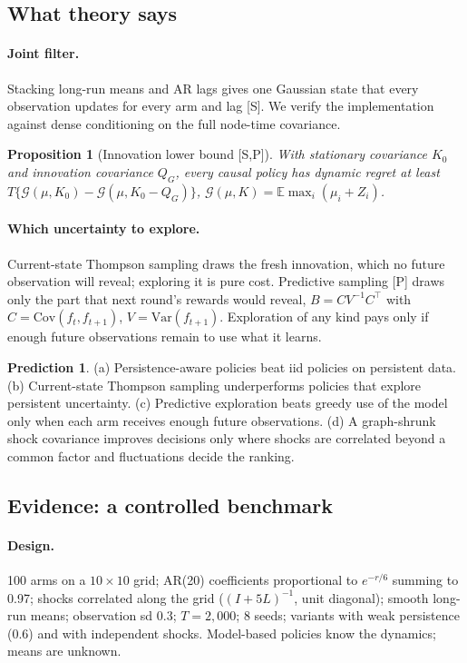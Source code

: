 \documentclass[11pt]{article}
\newtheorem{proposition}[theorem]{Proposition}
\theoremstyle{definition}
\newtheorem{prediction}{Prediction}
\theoremstyle{remark}
\newcommand{\E}{\mathbb{E}}
\newcommand{\Var}{\mathrm{Var}}
\newcommand{\Cov}{\mathrm{Cov}}
\newcommand{\src}[1]{\textsf{[#1]}}
\begin{document}
\subsection{What theory says}

\paragraph{Joint filter.} Stacking long-run means and AR lags gives one Gaussian state that every observation updates for every arm and lag \src{S}. We verify the implementation against dense conditioning on the full node-time covariance.

\begin{proposition}[Innovation lower bound \src{S,P}]\label{prop:floor}
With stationary covariance $K_0$ and innovation covariance $Q_G$, every causal policy has dynamic regret at least $T\{\mathcal G(\mu,K_0)-\mathcal G(\mu,K_0-Q_G)\}$, $\mathcal G(\mu,K)=\E\max_i(\mu_i+Z_i)$.
\end{proposition}

\paragraph{Which uncertainty to explore.} Current-state Thompson sampling draws the fresh innovation, which no future observation will reveal; exploring it is pure cost. Predictive sampling \src{P} draws only the part that next round's rewards would reveal, $B=CV^{-1}C^\top$ with $C=\Cov(f_t,f_{t+1})$, $V=\Var(f_{t+1})$. Exploration of any kind pays only if enough future observations remain to use what it learns.

\begin{prediction}\label{pred:q4}
(a) Persistence-aware policies beat iid policies on persistent data. (b) Current-state Thompson sampling underperforms policies that explore persistent uncertainty. (c) Predictive exploration beats greedy use of the model only when each arm receives enough future observations. (d) A graph-shrunk shock covariance improves decisions only where shocks are correlated beyond a common factor and fluctuations decide the ranking.
\end{prediction}

\subsection{Evidence: a controlled benchmark}

\paragraph{Design.} 100 arms on a $10\times10$ grid; AR(20) coefficients proportional to $e^{-r/6}$ summing to 0.97; shocks correlated along the grid ($(I+5L)^{-1}$, unit diagonal); smooth long-run means; observation sd 0.3; $T=2{,}000$; 8 seeds; variants with weak persistence (0.6) and with independent shocks. Model-based policies know the dynamics; means are unknown.
\end{document}
